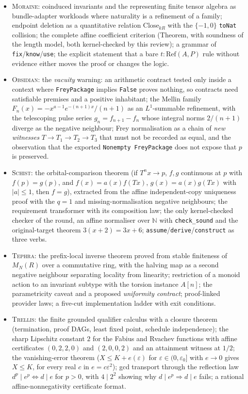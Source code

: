 \documentclass[11pt,a4paper]{article}
\newcommand{\code}[1]{\nolinkurl{#1}}
\newcommand{\Mr}{\textsc{Moraine}}
\newcommand{\Ob}{\textsc{Obsidian}}
\newcommand{\Sc}{\textsc{Schist}}
\newcommand{\Tp}{\textsc{Tephra}}
\newcommand{\Tr}{\textsc{Trellis}}
\newcommand{\N}{\mathbb N}
\theoremstyle{definition}
\begin{document}
\begin{itemize}
\item \Mr: coinduced invariants and the representing finite tensor algebra as bundle-adapter workloads where naturality is a refinement of a family; endpoint deletion as a quantitative relation $\mathrm{Close}_{kR}$ with the $\{-1,0\}$ \code{toNat} collision; the complete affine coefficient criterion (Theorem, with soundness of the length model, both kernel-checked by this review); a grammar of \code{fix}/\code{know}/\code{use}; the explicit statement that a bare $t:\mathrm{Ref}(A,P)$ rule without evidence either moves the proof or changes the logic.
\item \Ob: the \emph{vacuity} warning: an arithmetic contract tested only inside a context where \code{FreyPackage} implies \code{False} proves nothing, so contracts need satisfiable premises and a positive inhabitant; the Mellin family $F_n(x)=-x^{a-1}e^{-(n+1)x}/(n+1)$ as an $L^1$-summable refinement, with the telescoping pulse series $g_n=f_{n+1}-f_n$ whose integral norms $2/(n+1)$ diverge as the negative neighbour; Frey normalisation as a chain of \emph{new witnesses} $T\to T_1\to T_2\to T_3$ that must not be recorded as equal, and the observation that the exported \code{Nonempty FreyPackage} does not expose that $p$ is preserved.
\item \Sc: the orbital-comparison theorem (if $T^n x\to p$, $f,g$ continuous at $p$ with $f(p)=g(p)$, and $f(x)=a(x)f(Tx)$, $g(x)=a(x)g(Tx)$ with $|a|\le1$, then $f=g$), extracted from the affine independent-copy uniqueness proof with the $q=1$ and missing-normalisation negative neighbours; the requirement transformer with its composition law; the only kernel-checked checker of the round, an affine normaliser over $\N$ with \code{check_sound} and the original-target theorem $3(x+2)=3x+6$; \code{assume}/\code{derive}/\code{construct} as three verbs.
\item \Tp: the prefix-local inverse theorem proved from stable finiteness of $M_N(R)$ over a commutative ring, with the halving map as a second negative neighbour separating locality from linearity; restriction of a monoid action to an invariant subtype with the torsion instance $A[n]$; the parametricity caveat and a proposed \emph{uniformity contract}; proof-linked provider laws; a five-cut implementation ladder with exit conditions.
\item \Tr: the finite grounded qualifier calculus with a closure theorem (termination, proof DAGs, least fixed point, schedule independence); the sharp Lipschitz constant $2$ for the Fabius and Rvachev functions with affine certificates $(0,2,2,0)$ and $(2,0,0,2)$ and an attainment witness at $1/2$; the vanishing-error theorem ($X\le K+e(\varepsilon)$ for $\varepsilon\in(0,\varepsilon_0]$ with $e\to0$ gives $X\le K$, for every real $c$ in $e=c\varepsilon^2$); gcd transport through the reflection law $d^p\mid e^p\iff d\mid e$ for $p>0$, with $4\mid2^2$ showing why $d\mid e^p\Rightarrow d\mid e$ fails; a rational affine-nonnegativity certificate format.
\end{itemize}
\end{document}
